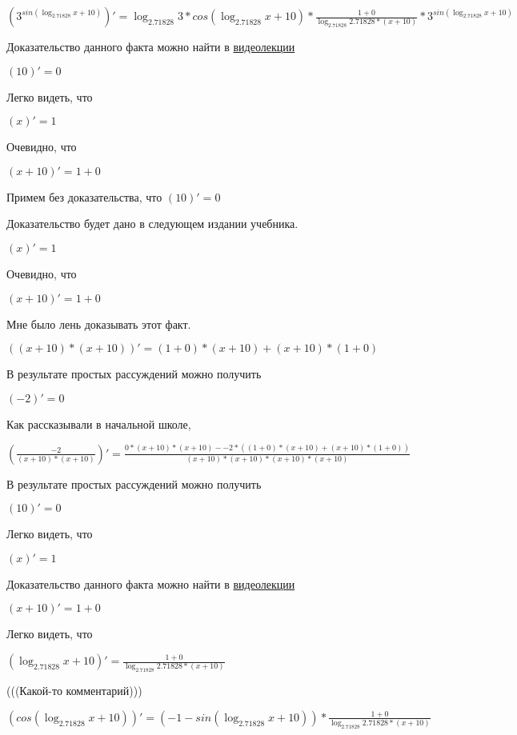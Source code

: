 \documentclass[12pt,a4paper,fleqn]{article}
\theoremstyle{definition}
\begin{document}
$({ 3 }^{sin(\log_{ 2.71828 }{ x  +  10 })})' = \log_{ 2.71828 }{ 3 } * cos(\log_{ 2.71828 }{ x  +  10 }) * \frac{ 1  +  0 }{\log_{ 2.71828 }{ 2.71828 } * ( x  +  10 )}
 * { 3 }^{sin(\log_{ 2.71828 }{ x  +  10 })}$

Доказательство данного факта можно найти в \href{https://www.youtube.com/watch?v=dQw4w9WgXcQ}{видеолекции}

$( 10 )' =  0 $

Легко видеть, что

$( x )' =  1 $

Очевидно, что

$( x  +  10 )' =  1  +  0 $

Примем без доказательства, что
$( 10 )' =  0 $

Доказательство будет дано в следующем издании учебника.

$( x )' =  1 $

Очевидно, что

$( x  +  10 )' =  1  +  0 $

Мне было лень доказывать этот факт.

$(( x  +  10 ) * ( x  +  10 ))' = ( 1  +  0 ) * ( x  +  10 ) + ( x  +  10 ) * ( 1  +  0 )$

В результате простых рассуждений можно получить

$( -2 )' =  0 $

Как рассказывали в начальной школе,

$(\frac{ -2 }{( x  +  10 ) * ( x  +  10 )}
)' = \frac{ 0  * ( x  +  10 ) * ( x  +  10 ) -  -2  * (( 1  +  0 ) * ( x  +  10 ) + ( x  +  10 ) * ( 1  +  0 ))}{( x  +  10 ) * ( x  +  10 ) * ( x  +  10 ) * ( x  +  10 )}
$

В результате простых рассуждений можно получить

$( 10 )' =  0 $

Легко видеть, что

$( x )' =  1 $

Доказательство данного факта можно найти в \href{https://www.youtube.com/watch?v=dQw4w9WgXcQ}{видеолекции}

$( x  +  10 )' =  1  +  0 $

Легко видеть, что

$(\log_{ 2.71828 }{ x  +  10 })' = \frac{ 1  +  0 }{\log_{ 2.71828 }{ 2.71828 } * ( x  +  10 )}
$

(((Какой-то комментарий)))

$(cos(\log_{ 2.71828 }{ x  +  10 }))' = ( -1  - sin(\log_{ 2.71828 }{ x  +  10 })) * \frac{ 1  +  0 }{\log_{ 2.71828 }{ 2.71828 } * ( x  +  10 )}
$
\end{document}
